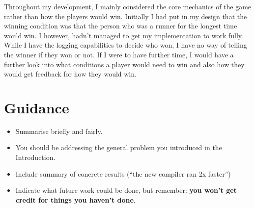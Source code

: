 \documentclass{l4proj}
\begin{document}
Throughout my development, I mainly considered the core mechanics of the game rather than how the players would win.
Initially I had put in my design that the winning condition was that the person who was a runner for the longest time
would win. I however, hadn't managed to get my implementation to work fully. While I have the logging capabilities to
decide who won, I have no way of telling the winner if they won or not. If I were to have further time, I would have a
further look into what conditions a player would need to win and also how they would get feedback for how they would win.

\section{Guidance}
\begin{itemize}
    \item
        Summarise briefly and fairly.
    \item
        You should be addressing the general problem you introduced in the
        Introduction.        
    \item
        Include summary of concrete results (``the new compiler ran 2x
        faster'')
    \item
        Indicate what future work could be done, but remember: \textbf{you
        won't get credit for things you haven't done}.
\end{itemize}


%
% 
\end{document}
